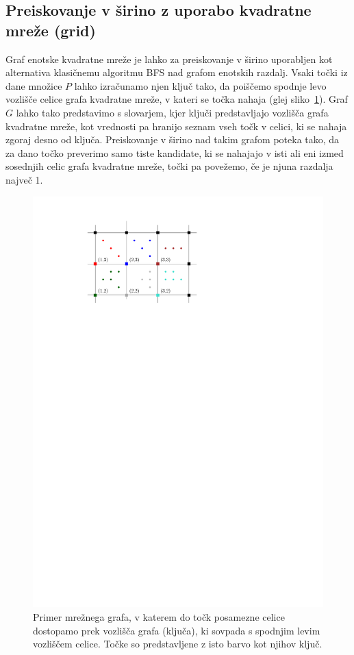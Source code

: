 \documentclass[a4paper, 12pt]{book}
\begin{document}

\subsection{Preiskovanje v širino z uporabo kvadratne mreže (grid)}
Graf enotske kvadratne mreže je lahko za preiskovanje v širino uporabljen kot alternativa klasičnemu algoritmu BFS nad grafom enotskih razdalj. Vsaki točki iz dane množice $P$ lahko izračunamo njen ključ tako, da poiščemo spodnje levo vozlišče celice grafa kvadratne mreže, v kateri se točka nahaja (glej sliko~\ref{grid-fig}). Graf $G$ lahko tako predstavimo s slovarjem, kjer ključi predstavljajo vozlišča grafa kvadratne mreže, kot vrednosti pa hranijo seznam vseh točk v celici, ki se nahaja zgoraj desno od ključa. Preiskovanje v širino nad takim grafom poteka tako, da za dano točko preverimo samo tiste kandidate, ki se nahajajo v isti ali eni izmed sosednjih celic grafa kvadratne mreže, točki pa povežemo, če je njuna razdalja največ 1.

\begin{figure}[htp]
\centerline{\includegraphics[scale=1.2]{pics/grid.pdf}}
\caption{Primer mrežnega grafa, v katerem do točk posamezne celice dostopamo prek vozlišča grafa (ključa), ki sovpada s spodnjim levim vozliščem celice. Točke so predstavljene z isto barvo kot njihov ključ.}
\label{grid-fig}
\end{figure}
\end{document}

